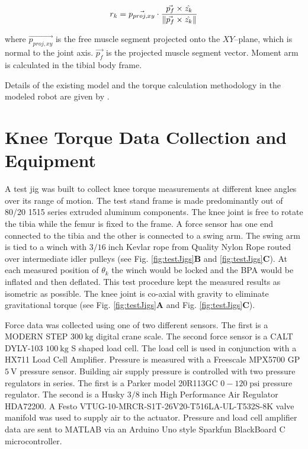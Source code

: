 \begin{equation}
    r_{k} = \Vec{p_{proj,xy}} \cdot \frac{\Vec{p_f} \times \hat{z_{k}}} { \lVert\Vec{p_f} \times \hat{z_{k}} \rVert} \label{eq:project_ma}
\end{equation}

where $\Vec{p_{proj,xy}}$ is the free muscle segment projected onto the $XY$--plane, which is normal to the joint axis. $\Vec{p_f}$ is the projected muscle segment vector. Moment arm is calculated in the tibial body frame.

Details of the existing model and the torque calculation methodology in the modeled robot are given by \citet{bolen_determination_2019, morrow_optimization_2020}.


\section{Knee Torque Data Collection and Equipment}\label{sec:torque_equipment}


A test jig was built to collect knee torque measurements at different knee angles over its range of motion. The test stand frame is made predominantly out of 80/20 1515 series extruded aluminum components. The knee joint is free to rotate the tibia while the femur is fixed to the frame. A force sensor has one end connected to the tibia and the other is connected to a swing arm. The swing arm is tied to a winch with $3/16\; \text{inch}$ Kevlar rope from Quality Nylon Rope routed over intermediate idler pulleys (see Fig. \ref{fig:testJigs}\textbf{B} and \ref{fig:testJigs}\textbf{C}). At each measured position of $\theta_{k}$ the winch would be locked and the BPA would be inflated and then deflated. This test procedure kept the measured results as isometric as possible.  The knee joint is co-axial with gravity to eliminate gravitational torque (see Fig. \ref{fig:testJigs}\textbf{A} and Fig. \ref{fig:testJigs}\textbf{C}).

Force data was collected using one of two different sensors. The first is a MODERN STEP $\qty{300}{\kilo\gram}$ digital crane scale. The second force sensor is a CALT DYLY-103 $\qty{100}{\kilo\gram}$ S shaped load cell. The load cell is used in conjunction with a HX711 Load Cell Amplifier. Pressure is measured with a Freescale MPX5700 GP $\qty{5}{\volt}$ pressure sensor. Building air supply pressure is controlled with two pressure regulators in series. The first is a Parker model 20R113GC $0-120\; \text{psi}$ pressure regulator. The second is a Husky $3/8 \; \text{inch}$ High Performance Air Regulator HDA72200. A Festo VTUG-10-MRCR-S1T-26V20-T516LA-UL-T532S-8K valve manifold was used to supply air to the actuator. Pressure and load cell amplifier data are sent to MATLAB via an Arduino Uno style Sparkfun BlackBoard C microcontroller. 

